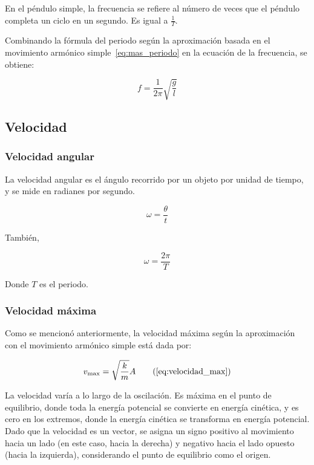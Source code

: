 \documentclass[letterpaper]{report}
\numberwithin{table}{section}
\begin{document}
En el péndulo simple, la frecuencia se refiere al número de veces que el péndulo
completa un ciclo en un segundo. Es igual a $\frac{1}{T}$.

Combinando la fórmula del periodo según la aproximación basada en
el movimiento armónico simple~\eqref{eq:mas_periodo} en la ecuación de la
frecuencia, se obtiene:

\begin{equation}
  f = \frac{1}{2\pi}\sqrt{\frac{g}{l}}
\end{equation}

\subsection{Velocidad}

\subsubsection{Velocidad angular}

La velocidad angular es el ángulo recorrido por un objeto por unidad
de tiempo, y se mide en radianes por segundo.

\begin{equation}
  \omega = \frac{\theta}{t} \label{eq:velocidad_angular}
\end{equation}

También,

\begin{equation}
  \omega = \frac{2\pi}{T}
\end{equation}

Donde $T$ es el periodo.

\subsubsection{Velocidad máxima}

Como se mencionó anteriormente, la velocidad máxima según la
aproximación con el movimiento armónico simple está dada por:

\begin{equation}
  v_{\max} = \sqrt{\frac{k}{m}}A \tag{\ref{eq:velocidad_max}}
\end{equation}

La velocidad varía a lo largo de la oscilación. Es máxima en el punto
de equilibrio, donde toda la energía potencial se convierte en
energía cinética, y es cero en los extremos, donde la energía
cinética se transforma en energía potencial. Dado que la velocidad es
un vector, se asigna un signo positivo al movimiento hacia un lado
(en este caso, hacia la derecha) y negativo hacia el lado opuesto
(hacia la izquierda), considerando el punto de equilibrio como el origen.
\end{document}

